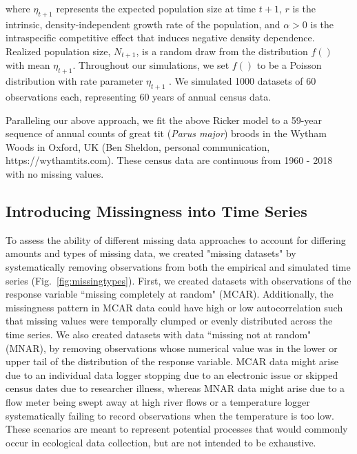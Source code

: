 \documentclass{article}
\begin{document}
\noindent where \(\eta_{t+1}\) represents the expected population size at time \(t+1\), \(r\) is the intrinsic, density-independent growth rate of the population, and $\alpha > 0$ is the intraspecific competitive effect that induces negative density dependence. %
Realized population size, $N_{t+1}$, is a random draw from the distribution $f()$ with mean $\eta_{t+1}$. Throughout our simulations, we set $f()$ to be a Poisson distribution with rate parameter $\eta_{t+1}$%
. We simulated 1000 datasets of 60 observations each, representing 60 years of annual census data. 

Paralleling our above approach, we fit the above Ricker model to a 59-year sequence of annual counts of great tit (\textit{Parus major}) broods in the Wytham Woods in Oxford, UK (Ben Sheldon, personal communication, https://wythamtits.com). These census data are continuous from 1960 - 2018 with no missing values. %

\subsection*{Introducing Missingness into Time Series}

To assess the ability of different missing data approaches to account for differing amounts and types of missing data, we created "missing datasets" by systematically removing observations from both the empirical and simulated time series (Fig.\ \ref{fig:missingtypes}). First, we created datasets with observations of the response variable ``missing completely at random" (MCAR). Additionally, the missingness pattern in MCAR data could have high or low autocorrelation such that missing values were temporally clumped or evenly distributed across the time series. We also created datasets with data ``missing not at random" (MNAR), by removing observations whose numerical value was in the lower or upper tail of the distribution of the response variable. MCAR data might arise due to an individual data logger stopping due to an electronic issue or skipped census dates due to researcher illness, whereas MNAR data might arise due to a flow meter being swept away at high river flows or a temperature logger systematically failing to record observations when the temperature is too low. These scenarios are meant to represent potential processes that would commonly occur in ecological data collection, but are not intended to be exhaustive.
\end{document}
